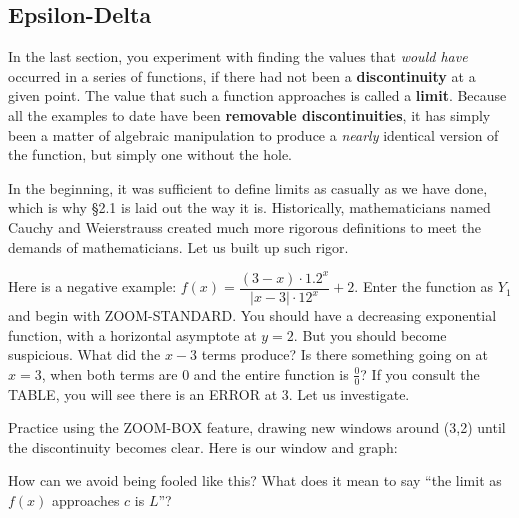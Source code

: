 
\subsection{Epsilon-Delta}



In the last section, you experiment with finding the values that \emph{would have}
occurred in a series of functions, if there had not been a \textbf{discontinuity} at a given
point.  The value that such a function approaches is called a \textbf{limit}.  Because all the
examples to date have been \textbf{removable discontinuities}, it has simply been a matter
of algebraic manipulation to produce a \emph{nearly} identical version of the function, but
simply one without the hole.

In the beginning, it was sufficient to define limits as casually as we have done, which is why
§2.1 is laid out the way it is.  Historically, mathematicians named Cauchy and Weierstrauss created
much more rigorous definitions to meet the demands of mathematicians.  Let us built up such rigor.

Here is a negative example: $f(x)=\dfrac{(3-x)\cdot1.2^x}{|x-3|\cdot12^x}+2$.  Enter the 
function as $Y_1$ and begin with ZOOM-STANDARD.  You should have a decreasing
exponential function, with a horizontal asymptote at $y=2$.  But you should become
suspicious.  What did the $x-3$ terms produce?  Is there something going on at $x=3$,
when both terms are 0 and the entire function is $\frac{0}{0}$?  If you consult the
TABLE, you will see there is an ERROR at 3.  Let us investigate.

Practice using the ZOOM-BOX feature, drawing new windows around (3,2) until the 
discontinuity becomes clear.  Here is our window and graph:



How can we avoid being fooled like this?  What does it mean to say ``the limit as
$f(x)$ approaches $c$ is $L$''?




